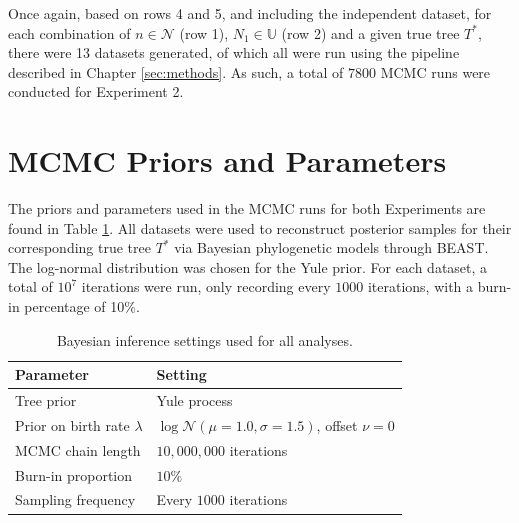 Once again, based on rows 4 and 5, and including the independent dataset, for each combination of $n \in \mathcal{N}$ (row 1), $N_1 \in \mathbb{U}$ (row 2) and a given true tree $T^*$, there were 13 datasets generated, of which all were run using the pipeline described in Chapter \ref{sec:methods}. As such, a total of $7800$ MCMC runs were conducted for Experiment 2.

\section{MCMC Priors and Parameters}
The priors and parameters used in the MCMC runs for both Experiments are found in Table \ref{tab:inference_settings}. All datasets were used to reconstruct posterior samples for their corresponding true tree $T^*$ via Bayesian phylogenetic models through BEAST. The log-normal distribution was chosen for the Yule prior. For each dataset, a total of $10^7$ iterations were run, only recording every $1000$ iterations, with a burn-in percentage of 10\%.  

\begin{table}[htbp]
\centering
\begin{tabular}{l p{7cm}}
\hline
Parameter & Setting \\
\hline
Tree prior & Yule process \\
Prior on birth rate $\lambda$ &
$\log \mathcal{N}(\mu = 1.0, \sigma = 1.5)$, offset $\nu = 0$ \\
MCMC chain length & $10{,}000{,}000$ iterations \\
Burn-in proportion & $10\%$ \\
Sampling frequency & Every $1000$ iterations \\
\hline
\end{tabular}
\caption{Bayesian inference settings used for all analyses.}
\label{tab:inference_settings}
\end{table}